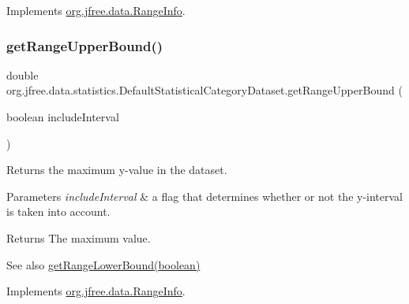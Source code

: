 Implements \mbox{\hyperlink{interfaceorg_1_1jfree_1_1data_1_1_range_info_ab0187015bbe75ca00a62a71de72c1a1d}{org.\+jfree.\+data.\+Range\+Info}}.

\mbox{\label{classorg_1_1jfree_1_1data_1_1statistics_1_1_default_statistical_category_dataset_a11d0eee861d88a758d3a400d428aebc8}} 
\subsubsection{\texorpdfstring{get\+Range\+Upper\+Bound()}{getRangeUpperBound()}}
{\footnotesize\ttfamily double org.\+jfree.\+data.\+statistics.\+Default\+Statistical\+Category\+Dataset.\+get\+Range\+Upper\+Bound (\begin{DoxyParamCaption}\item[{boolean}]{include\+Interval }\end{DoxyParamCaption})}

Returns the maximum y-\/value in the dataset.


\begin{DoxyParams}{Parameters}
{\em include\+Interval} & a flag that determines whether or not the y-\/interval is taken into account.\\
\hline
\end{DoxyParams}
\begin{DoxyReturn}{Returns}
The maximum value.
\end{DoxyReturn}
\begin{DoxySeeAlso}{See also}
\mbox{\hyperlink{classorg_1_1jfree_1_1data_1_1statistics_1_1_default_statistical_category_dataset_ae20e8ce5b0dfff4b36629d20584e0f20}{get\+Range\+Lower\+Bound(boolean)}} 
\end{DoxySeeAlso}


Implements \mbox{\hyperlink{interfaceorg_1_1jfree_1_1data_1_1_range_info_a85987bb398c50351d190b2b888ff3348}{org.\+jfree.\+data.\+Range\+Info}}.

\mbox{\label{classorg_1_1jfree_1_1data_1_1statistics_1_1_default_statistical_category_dataset_ae1ca17a2e7625045f1fd159054566ca8}} 
